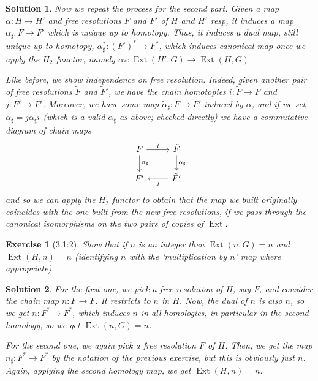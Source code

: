 \documentclass{article}
\theoremstyle{plain}
\newtheorem*{ex}{Exercise}
\theoremstyle{nonumberplain}
\newtheorem{sol}{Solution}
\DeclareMathOperator{\Ext}{Ext}
\begin{document}
\begin{sol}
\medskip

Now we repeat the process for the second part. Given a map $\alpha \colon H \to H'$ and free resolutions $F$ and $F'$ of $H$ and $H'$ resp, it induces a map $\alpha_\sharp \colon F \to F'$ which is unique up to homotopy. Thus, it induces a dual map, still unique up to homotopy, $\alpha_\sharp^* \colon (F')^* \to F^*$, which induces canonical map once we apply the $H_2$ functor, namely $\alpha_* \colon \Ext(H',G) \to \Ext(H,G)$.

Like before, we show independence on free resolution. Indeed, given another pair of free resolutions $\tilde F$ and $\tilde F'$, we have the chain homotopies $i \colon \tilde F \to F$ and $j \colon F' \to \tilde F'$. Moreover, we have some map $\tilde \alpha_\sharp \colon \tilde F \to \tilde F'$ induced by $\alpha$, and if we set $\alpha_\sharp = j \tilde \alpha_\sharp i$ (which is a valid $\alpha_\sharp$ as above; checked directly) we have a commutative diagram of chain maps
\[\begin{tikzcd}
F \arrow[d, "\alpha_\sharp"] \arrow[r, "i"] & \tilde F \arrow[d, "\tilde \alpha_\sharp"] \\
F'                                          & \tilde F' \arrow[l, "j"]                  
\end{tikzcd}\]
and so we can apply the $H_2$ functor to obtain that the map we built originally coincides with the one built from the new free resolutions, if we pass through the canonical isomorphisms on the two pairs of copies of $\Ext$.
\end{sol}

\begin{ex}[3.1:2]
Show that if $n$ is an integer then $\Ext(n,G) = n$ and $\Ext(H,n) = n$ (identifying $n$ with the `multiplication by $n$' map where appropriate).
\end{ex}

\begin{sol}
For the first one, we pick a free resolution of $H$, say $F$, and consider the chain map $n \colon F \to F$. It restricts to $n$ in $H$. Now, the dual of $n$ is also $n$, so we get $n \colon F^* \to F^*$, which induces $n$ in all homologies, in particular in the second homology, so we get $\Ext(n,G) = n$.

For the second one, we again pick a free resolution $F$ of $H$. Then, we get the map $n_\sharp \colon F^* \to F^*$ by the notation of the previous exercise, but this is obviously just $n$. Again, applying the second homology map, we get $\Ext(H,n) = n$.
\end{sol}
\end{document}
